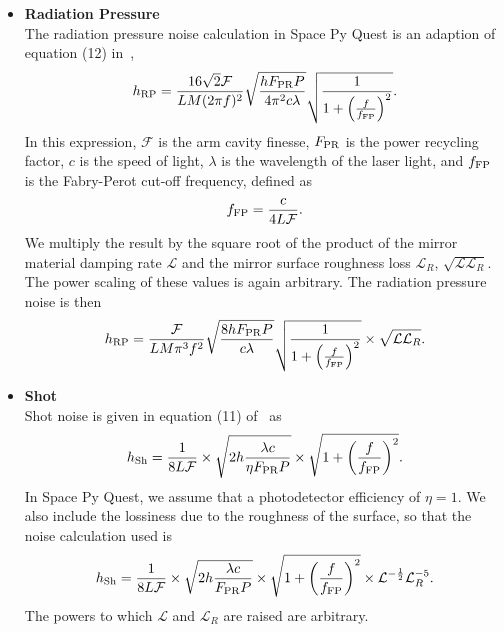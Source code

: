 \documentclass{article}
\begin{document}
    \begin{itemize}
        \item \textbf{Radiation Pressure} \\
    The radiation pressure noise calculation in Space Py Quest is an
    adaption of equation (12) in~\cite{Virgo-sens}, 
    \begin{equation}
    h_{\rm RP} = \frac{16\sqrt{2}\mathcal{F}}{LM(2\pi f)^2}\sqrt{\frac{hF_{\rm PR}P}{4\pi^2c\lambda}}\sqrt{\frac{1}{1 + \left(\frac{f}{f_{\rm FP}}\right)^2}}.
    \end{equation}
    In this expression, $\mathcal{F}$ is the arm cavity finesse,
    $F_{\rm PR}$ is the power recycling factor, $c$ is the speed of light,
    $\lambda$ is the wavelength of the laser light, and $f_{\rm FP}$ is
    the Fabry-Perot cut-off frequency, defined as
    \begin{equation}
        f_{\rm FP} = \frac{c}{4L\mathcal{F}}.
    \end{equation}
We multiply the result by the square root of the product of the
   mirror material damping rate $\mathcal{L}$ and the mirror surface
   roughness loss $\mathcal{L}_R$,
   $\sqrt{\mathcal{L}\mathcal{L}_R}$. The power scaling of these
   values is again arbitrary. The radiation pressure noise is then
    \begin{equation}
    \label{eqn::radiation}
    h_{\rm RP} = \frac{\mathcal{F}}{LM\pi^3f^2}\sqrt{\frac{8hF_{\rm PR}P}{c\lambda}}\sqrt{\frac{1}{1 + \left(\frac{f}{f_{\rm FP}}\right)^2}} \times \sqrt{\mathcal{L}\mathcal{L}_R}.
    \end{equation}
  
    \item \textbf{Shot} \\
    Shot noise is given in equation (11) of~\cite{Virgo-sens} as
    \begin{equation}
    h_{\rm Sh} = \frac{1}{8L\mathcal{F}}\times\sqrt{2h\frac{\lambda c}{\eta F_{\rm PR}P}}\times\sqrt{1 + \left(\frac{f}{f_{\rm FP}}\right)^2}.
    \end{equation}
    In Space Py Quest, we assume that a photodetector efficiency of
    $\eta = 1$. We also include the
    lossiness due to the roughness of the surface, so that the noise
    calculation used is
    \begin{equation}
    \label{eqn::shot}
    h_{\rm Sh} = \frac{1}{8L\mathcal{F}}\times\sqrt{2h\frac{\lambda c}{F_{\rm PR}P}}\times\sqrt{1 + \left(\frac{f}{f_{\rm FP}}\right)^2}\times\mathcal{L}^{-\frac{1}{2}}\mathcal{L}_R^{-5}.
    \end{equation}
    The powers to which $\mathcal{L}$ and $\mathcal{L}_R$ are raised are arbitrary.
    \end{itemize}
\end{document}
